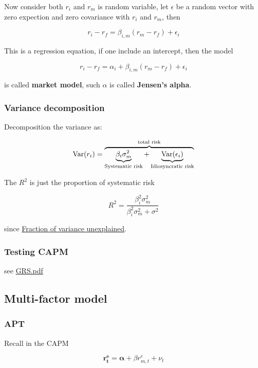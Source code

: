 \documentclass{article}
\begin{document}
Now consider both \(r_i\) and \(r_m\) is random variable, let
\(\epsilon\) be a random vector with zero expection and zero covariance
with \(r_i\) and \(r_m\), then

\[ 
r_i-r_f=\beta_{i,m}(r_m-r_f)+\epsilon_i
\]

This is a regression equation, if one include an intercept, then the
model

\[ 
r_i-r_f=\alpha_i+\beta_{i,m}(r_m-r_f)+\epsilon_i
\]

is called \textbf{market model}, such \(\alpha\) is called
\textbf{Jensen's alpha}.

\hypertarget{variance-decomposition}{%
\subsubsection{Variance decomposition}\label{variance-decomposition}}

Decomposition the variance as:

\[ \operatorname{Var}(r_i)=\overbrace{\underbrace{\beta_i\sigma_m^2}_{\text{Systematic risk}}+\underbrace{\operatorname{Var}(\epsilon_i)}_{\text{Idiosyncratic risk}}}^{\text{total risk}} \]

The \(R^2\) is just the proportion of systematic risk

\[ R^2=\frac{\beta_i^2\sigma_m^2}{\beta_i^2\sigma_m^2+\sigma^2} \]

since
\href{https://en.wikipedia.org/wiki/Fraction_of_variance_unexplained}{Fraction
of variance unexplained}.

\hypertarget{testing-capm}{%
\subsubsection{Testing CAPM}\label{testing-capm}}

see \url{GRS.pdf}

\hypertarget{multi-factor-model}{%
\subsection{Multi-factor model}\label{multi-factor-model}}

\hypertarget{apt}{%
\subsubsection{APT}\label{apt}}

Recall in the CAPM

\[ \bm{\mathbf{r_t^e=\alpha}}+{\beta r_{m,t}^e+\nu_t} \]
\end{document}
